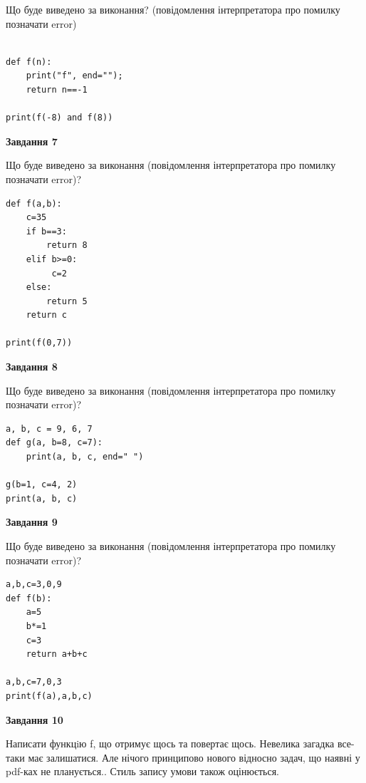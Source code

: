 \documentclass[12pt, ukrainian]{article}
\begin{document}
{\begin {large}
Що буде виведено за виконання? (повідомлення інтерпретатора про помилку позначати error)\par
\begin{verbatim}

def f(n):
    print("f", end="");
    return n==-1

print(f(-8) and f(8))
\end{verbatim}

{\begin {center}\textbf{Завдання 7}\end {center}}

Що буде виведено за виконання (повідомлення інтерпретатора про помилку позначати error)?\par
\begin{verbatim}
def f(a,b):
    c=35
    if b==3:
        return 8
    elif b>=0:
         c=2
    else: 
        return 5
    return c

print(f(0,7))
\end{verbatim}

{\begin {center}\textbf{Завдання 8}\end {center}}

Що буде виведено за виконання (повідомлення інтерпретатора про помилку позначати error)?\par
\begin{verbatim}
a, b, c = 9, 6, 7
def g(a, b=8, c=7):
    print(a, b, c, end=" ")

g(b=1, c=4, 2)
print(a, b, c)
\end{verbatim}

{\begin {center}\textbf{Завдання 9}\end {center}}

Що буде виведено за виконання (повідомлення інтерпретатора про помилку позначати error)?\par
\begin{verbatim}
a,b,c=3,0,9
def f(b):
    a=5
    b*=1
    c=3
    return a+b+c

a,b,c=7,0,3
print(f(a),a,b,c)
\end{verbatim}

{\begin {center}\textbf{Завдання 10}\end {center}}


Написати функцiю f, що отримує щось та повертає щось. Невелика загадка все-таки має залишатися. Але нічого принципово нового відносно задач, що наявні у pdf-ках не планується.. Стиль запису умови також оцінюється.\par
\end {large}}
\newpage
\end{document}
